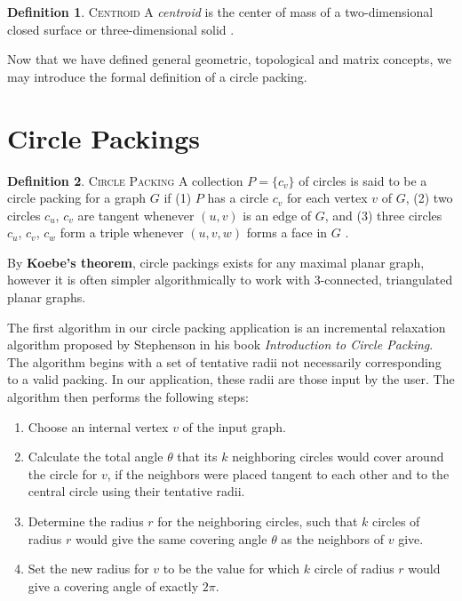 \documentclass[11pt]{article}
\theoremstyle{definition}
\newtheorem{definition}{Definition}[section]
\begin{document}
	\theoremstyle{definition}
	\begin{definition}{\textsc{Centroid}}
		A \emph{centroid} is the center of mass of a two-dimensional closed surface or three-dimensional solid \cite{mathworld:Centroid}.
	\end{definition}
	Now that we have defined general geometric, topological and matrix concepts, we may introduce the formal definition of a circle packing.

\section{Circle Packings}
	\theoremstyle{definition}
	\begin{definition}{\textsc{Circle Packing}}
		A collection $P = \{c_v\}$ of circles is said to be a circle packing for a graph $G$ if 
		(1) $P$ has a circle $c_v$ for each vertex $v$ of $G$, 
		(2) two circles $c_u$, $c_v$ are tangent whenever $(u,v)$ is an edge of $G$, and 
		(3) three circles $c_u$, $c_v$, $c_w$ form a triple whenever $(u,v,w)$ forms a face in $G$ \cite{stephenson05introduction}.
	\end{definition}

	By \textbf{Koebe's theorem}, circle packings exists for any maximal planar graph, however it is often simpler algorithmically to work with 3-connected, triangulated planar graphs.

	The first algorithm in our circle packing application is an incremental relaxation algorithm proposed by Stephenson in his book \emph{Introduction to Circle Packing}. 
	The algorithm begins with a set of tentative radii not necessarily corresponding to a valid packing. In our application, these radii are those input by the user. 
	The algorithm then performs the following steps:
	
	\begin{enumerate}
		\item Choose an internal vertex $v$ of the input graph.
		\item Calculate the total angle $\theta$ that its $k$ neighboring circles would cover around the circle for $v$, if the neighbors were placed tangent to each other and to the central circle using their tentative radii.
		\item Determine the radius $r$ for the neighboring circles, such that $k$ circles of radius $r$ would give the same covering angle $\theta$ as the neighbors of $v$ give.
		\item Set the new radius for $v$ to be the value for which $k$ circle of radius $r$ would give a covering angle of exactly $2\pi$.
	\end{enumerate}
	
\end{document}

